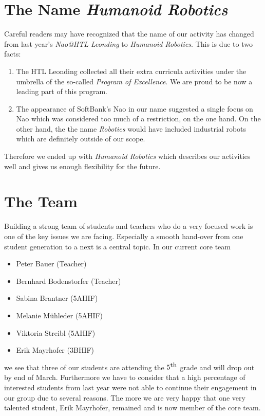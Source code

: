\documentclass[11pt]{article}
\begin{document}
\section{The Name {\em Humanoid Robotics}}
Careful readers may have recognized that the name of our activity has changed from last year's {\em Nao@HTL Leonding} to {\em Humanoid Robotics}. This is due to two facts:
\begin{enumerate}
	\item The HTL Leonding collected all their extra curricula activities under the umbrella of the so-called {\em Program of Excellence}. We are proud to be now a leading part of this program.
	\item The appearance of SoftBank's Nao in our name suggested a single focus on Nao which was considered too much of a restriction, on the one hand. On the other hand, the the name {\em Robotics} would have included industrial robots which are definitely outside of our scope.
\end{enumerate}
Therefore we ended up with {\em Humanoid Robotics} which describes our activities well and gives us enough flexibility for the future.

\section{The Team}
Building a strong team of students and teachers who do a very focused work is one of the key issues we are facing. Especially a smooth hand-over from one student generation to a next is a central topic.
In our current core team
\begin{itemize}
	\item Peter Bauer (Teacher)
	\item Bernhard Bodenstorfer (Teacher)
	\item Sabina Brantner (5AHIF)
	\item Melanie Mühleder (5AHIF)
	\item Viktoria Streibl (5AHIF)
	\item Erik Mayrhofer (3BHIF)
\end{itemize}
we see that three of our students are attending the $5^{\textrm{\small th}}$ grade and will drop out by end of March. Furthermore we have to consider that a high percentage of interested students from last year were not able to continue their engagement in our group due to several reasons. The more we are very happy that one very talented student, Erik Mayrhofer, remained and is now member of the core team.
\end{document}
